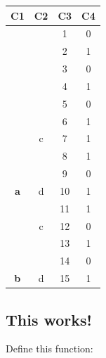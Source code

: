 \documentclass[
]{book}
\newenvironment{Shaded}{\begin{snugshade}}{\end{snugshade}}
\newcommand{\ControlFlowTok}[1]{\textcolor[rgb]{0.13,0.29,0.53}{\textbf{#1}}}
\newcommand{\DataTypeTok}[1]{\textcolor[rgb]{0.13,0.29,0.53}{#1}}
\newcommand{\DecValTok}[1]{\textcolor[rgb]{0.00,0.00,0.81}{#1}}
\newcommand{\ErrorTok}[1]{\textcolor[rgb]{0.64,0.00,0.00}{\textbf{#1}}}
\newcommand{\KeywordTok}[1]{\textcolor[rgb]{0.13,0.29,0.53}{\textbf{#1}}}
\newcommand{\NormalTok}[1]{#1}
\newcommand{\OperatorTok}[1]{\textcolor[rgb]{0.81,0.36,0.00}{\textbf{#1}}}
\newcommand{\StringTok}[1]{\textcolor[rgb]{0.31,0.60,0.02}{#1}}
\begin{document}
\begin{table}
\centering
\begin{tabular}[t]{>{}c|c|c|c}
\hline
C1 & C2 & C3 & C4\\
\hline
 &  & 1 & 0\\
\cline{3-4}
 &  & 2 & 1\\
\cline{3-4}
 &  & 3 & 0\\
\cline{3-4}
 &  & 4 & 1\\
\cline{3-4}
 &  & 5 & 0\\
\cline{3-4}
 &  & 6 & 1\\
\cline{3-4}
 & \multirow[t]{-7}{*}{\centering\arraybackslash c} & 7 & 1\\
\cline{2-4}
 &  & 8 & 1\\
\cline{3-4}
 &  & 9 & 0\\
\cline{3-4}
\multirow[t]{-10}{*}{\centering\arraybackslash \textbf{a}} & \multirow[t]{-3}{*}{\centering\arraybackslash d} & 10 & 1\\
\cline{1-4}
 &  & 11 & 1\\
\cline{3-4}
 & \multirow[t]{-2}{*}{\centering\arraybackslash c} & 12 & 0\\
\cline{2-4}
 &  & 13 & 1\\
\cline{3-4}
 &  & 14 & 0\\
\cline{3-4}
\multirow[t]{-5}{*}{\centering\arraybackslash \textbf{b}} & \multirow[t]{-3}{*}{\centering\arraybackslash d} & 15 & 1\\
\hline
\end{tabular}
\end{table}

\hypertarget{this-works}{%
\subsection{This works!}\label{this-works}}

Define this function:

\begin{Shaded}
\end{Shaded}
\end{document}
